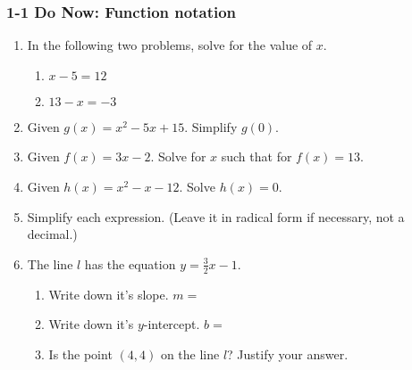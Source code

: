 \documentclass[12pt, twoside]{article}
\begin{document}
\subsubsection*{1-1 Do Now: Function notation}
  \begin{enumerate}


  \item In the following two problems, solve for the value of $x$.
  \begin{multicols}{2}
    \begin{enumerate}
      \item   $x-5=12$ \vspace{6cm}
      \item   $13-x=-3$ \vspace{6cm}
    \end{enumerate}
  \end{multicols}
    \vspace{3cm}

  \item Given $g(x)=x^2-5x+15$. Simplify $g(0)$. \vspace{3cm}
  \item Given $f(x)=3x-2$. Solve for $x$ such that for $f(x)=13$. \vspace{4cm}
  \item Given $h(x)=x^2-x-12$. Solve $h(x)=0$. \vspace{5cm}
  

  \item Simplify each expression. (Leave it in radical form if necessary, not a decimal.)
    \begin{enumerate}
    \end{enumerate}
    \vspace{0.5cm}

\newpage

\item The line $l$ has the equation $y=\frac{3}{2}x-1$. 
\begin{enumerate}
  \item Write down it's slope. $m=$
  \vspace{0.5cm}
  \item Write down it's $y$-intercept. $b=$
  \vspace{0.5cm}
  \item Is the point $(4, 4)$ on the line $l$? Justify your answer.
\end{enumerate}
\vspace{2.5cm}


\end{enumerate}
\end{document}
